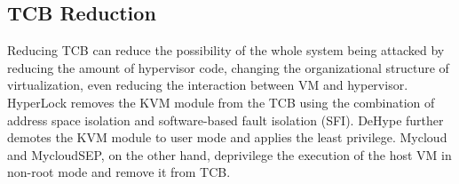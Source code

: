 \documentclass[conference]{IEEEtran}
\begin{document}

\subsection{TCB Reduction}
Reducing TCB can reduce the possibility of the whole system being attacked by reducing the amount of hypervisor code, changing the organizational structure of virtualization, even reducing the interaction between VM and hypervisor.
HyperLock\cite{hyperlock} removes the KVM module from the TCB using the combination of address space isolation and software-based fault isolation (SFI). DeHype\cite{dehy} further demotes the KVM module to user mode and applies the least privilege. Mycloud\cite{mycloud} and MycloudSEP\cite{Detangling}, on the other hand, deprivilege the execution of the host VM in non-root mode and remove it from TCB.
\end{document}
